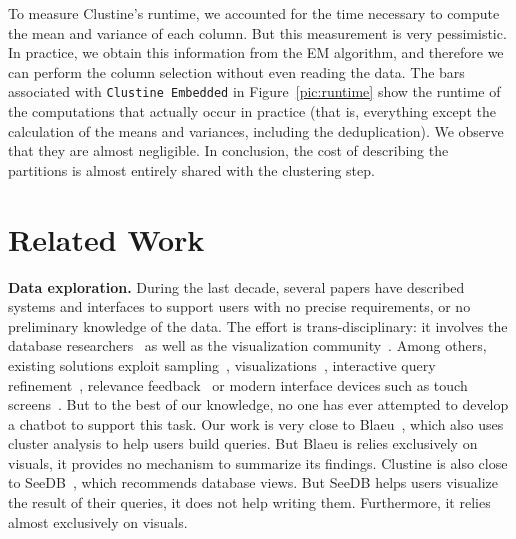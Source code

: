 
To measure Clustine's runtime, we accounted for the time necessary to compute
the mean and variance of each column. But this measurement is very pessimistic.
In practice, we obtain this information from the EM algorithm, and therefore we
can perform the column selection without even reading the data.  The bars
associated with \texttt{Clustine Embedded} in Figure~\ref{pic:runtime} show the
runtime of the computations that actually occur in practice (that is,
everything except the calculation of the means and variances, including the
deduplication). We observe that they are almost negligible.  In conclusion, the
cost of describing the partitions is almost entirely shared with the clustering
step.

\section{Related Work}
\label{sec:related}

\textbf{Data exploration.} During the last decade, several papers have
described systems and interfaces to support users with no precise requirements,
or no preliminary knowledge of the data. The effort is trans-disciplinary: it
involves the database researchers~\cite{idreos2015overview} as well as the
visualization community~\cite{StolteTangHanrahan2002}. Among others, existing
solutions exploit sampling~\cite{agarwal2012blink},
visualizations~\cite{StolteTangHanrahan2002}, interactive query
refinement~\cite{dimitriadou2014explore}, relevance
feedback~\cite{akbarnejad2010sql} or modern interface devices such as touch
screens~\cite{jiang2015snaptoquery}. But to the best of our knowledge, no one
has ever attempted to develop a chatbot to support this task. Our work is  very
close to Blaeu~\cite{sellamTKDE}, which also uses cluster analysis to help
users build queries. But Blaeu is relies exclusively on visuals, it provides no
mechanism to summarize its findings. Clustine is also close to
SeeDB~\cite{vartak2015see}, which recommends database views. But SeeDB helps
users visualize the result of their queries, it does not help writing them.
Furthermore, it relies almost exclusively on visuals.

